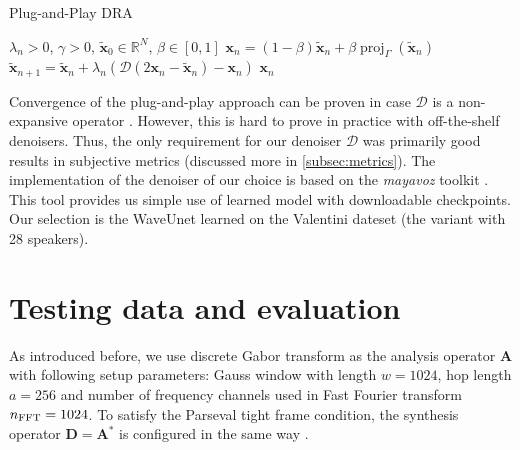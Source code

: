 \documentclass[conference]{IEEEtran}
\begin{document}
\begin{algorithm}
	\caption{Plug-and-Play DRA}
	\begin{algorithmic}[1]\label{alg:pnp}
		\renewcommand{\algorithmicrequire}{\textbf{Input:}}
		\renewcommand{\algorithmicensure}{\textbf{Output:}}
		\REQUIRE $ \lambda_n > 0 $, $ \gamma>0 $, $ \mathbf{\widetilde{x}}_0 \in \mathbb{R}^{N} $, $\beta \in [0, 1]$
		\STATE %
		$\mathbf{x}_n= (1-\beta)\mathbf{\widetilde{x}}_n + \beta \operatorname{proj}_{\Gamma}(\mathbf{\widetilde{x}}_n) $ 
		\STATE $ \mathbf{\widetilde{x}}_{n+1} = \mathbf{\widetilde{x}}_n + \lambda_n \left( \mathcal{D} \left(2\mathbf{x}_n-\mathbf{\widetilde{x}}_n \right)-\mathbf{x}_n\right)$
		\ENDFOR
		\RETURN $\mathbf{x}_n$ 
	\end{algorithmic} 
\end{algorithm}


Convergence of the plug-and-play approach can be proven in case $\mathcal{D}$ is a non-expansive operator \cite{Chan2016}.
However, this is hard to prove in practice with off-the-shelf denoisers.
Thus, the only requirement for our denoiser $\mathcal{D}$ was primarily good results in subjective metrics
(discussed more in \ref{subsec:metrics}).
The implementation of the denoiser of our choice is based on the \textit{mayavoz} toolkit \cite{Shahul2023}.
This tool provides us simple use of learned model with downloadable checkpoints.
Our selection is the WaveUnet learned on the Valentini dateset \cite{ValentiniBotinhao2017} (the variant with 28 speakers).

\section{Testing data and evaluation}\label{sec:eval}

As introduced before, we use discrete Gabor transform as the analysis operator $\mathbf{A}$ with following setup parameters: Gauss window with length $w =1024 $, hop length $a = 256$ and number of frequency channels used in Fast Fourier transform %
$n_{\textup{FFT}} = 1024$.
To satisfy the Parseval tight frame condition, the synthesis operator $\mathbf{D} = \mathbf{A}^*$ is configured in the same way \cite{Mokry2020}.
\end{document}

